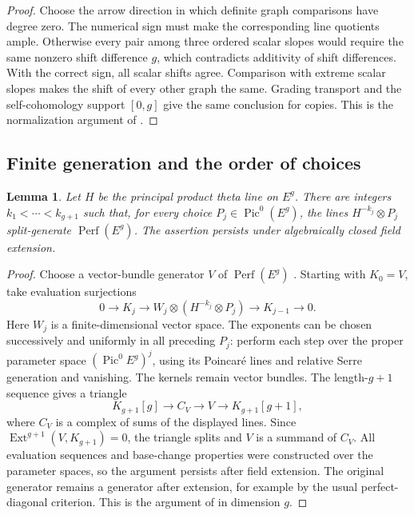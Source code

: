 \documentclass[11pt]{article}
\numberwithin{equation}{section}
\newtheorem{lemma}[theorem]{Lemma}
\theoremstyle{definition}
\theoremstyle{remark}
\begin{document}
\begin{proof}
Choose the arrow direction in which definite graph comparisons have
degree zero.  The numerical sign must make the corresponding line
quotients ample.  Otherwise every pair among three ordered scalar
slopes would require the same nonzero shift difference $g$, which
contradicts additivity of shift differences.  With the correct sign,
all scalar shifts agree.  Comparison with extreme scalar slopes makes
the shift of every other graph the same.  Grading transport and the
self-cohomology support $[0,g]$ give the same conclusion for copies.
This is the normalization argument of \cite[Lemma~9.2]{A8}.
\end{proof}

\subsection{Finite generation and the order of choices}

\begin{lemma}
\label{setup:graph-generation}
Let $H$ be the principal product theta line on $E^g$.  There are
integers $k_1<\cdots<k_{g+1}$ such that, for every choice
$P_j\in\operatorname{Pic}^0(E^g)$, the lines
$H^{-k_j}\otimes P_j$ split-generate $\operatorname{Perf}(E^g)$.
The assertion persists under algebraically closed field extension.
\end{lemma}

\begin{proof}
Choose a vector-bundle generator $V$ of $\operatorname{Perf}(E^g)$
\cite{BondalVanDenBergh}.  Starting with $K_0=V$, take evaluation
surjections
\[
 0\longrightarrow K_j\longrightarrow
 W_j\otimes(H^{-k_j}\otimes P_j)
 \longrightarrow K_{j-1}\longrightarrow0.
\]
Here $W_j$ is a finite-dimensional vector space.  The exponents can be
chosen successively and uniformly in all preceding $P_j$: perform each
step over the proper parameter space
$(\operatorname{Pic}^0 E^g)^j$, using its Poincar\'e lines and relative
Serre generation and vanishing.  The kernels remain vector bundles.
The length-$g+1$ sequence gives a triangle
\[
 K_{g+1}[g]\longrightarrow C_V\longrightarrow V
 \longrightarrow K_{g+1}[g+1],
\]
where $C_V$ is a complex of sums of the displayed lines.  Since
$\operatorname{Ext}^{g+1}(V,K_{g+1})=0$, the triangle splits and $V$ is a summand of
$C_V$.  All evaluation sequences and base-change properties were
constructed over the parameter spaces, so the argument persists after
field extension.  The original generator remains a generator after
extension, for example by the usual perfect-diagonal criterion.
This is the argument of \cite[Lemma~9.3]{A8} in dimension $g$.
\end{proof}
\end{document}
